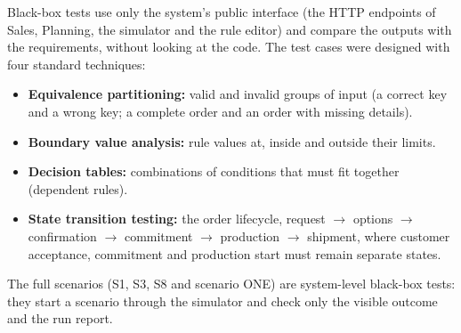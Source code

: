 Black-box tests use only the system's public interface (the HTTP endpoints of Sales, Planning, the simulator and the
rule editor) and compare the outputs with the requirements, without looking at the code. The test cases were designed
with four standard techniques:
\begin{itemize}
  \item \textbf{Equivalence partitioning:} valid and invalid groups of input (a correct key and a wrong key; a complete
        order and an order with missing details).
  \item \textbf{Boundary value analysis:} rule values at, inside and outside their limits.
  \item \textbf{Decision tables:} combinations of conditions that must fit together (dependent rules).
  \item \textbf{State transition testing:} the order lifecycle, request $\rightarrow$ options $\rightarrow$ confirmation
        $\rightarrow$ commitment $\rightarrow$ production $\rightarrow$ shipment, where customer acceptance, commitment
        and production start must remain separate states.
\end{itemize}
The full scenarios (S1, S3, S8 and scenario ONE) are system-level black-box tests: they start a scenario through the
simulator and check only the visible outcome and the run report.

